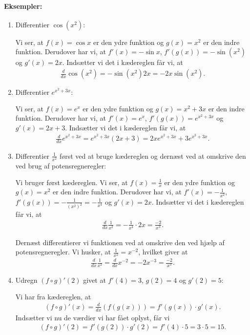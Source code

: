 \paragraph*{Eksempler:}
\begin{enumerate}
\item Differentier $\cos (x^2)$:

Vi ser, at $f(x)=\cos x$ er den ydre funktion og $g(x)=x^2$ er den indre funktion. Derudover har vi, at $f'(x)=-\sin x$, $f'(g(x))=-\sin(x^2)$ og $g'(x)=2x$. Indsætter vi det i kædereglen får vi, at
\begin{align*}
\frac{d}{dx}\cos(x^2) = -\sin (x^2) 2x = -2x\sin(x^2).
\end{align*}
\item Differentier $e^{x^2+3x}$:

Vi ser, at $f(x)=e^x$ er den ydre funktion og $g(x)=x^2+3x$ er den indre funktion. Derudover har vi, at $f'(x)=e^x$, $f'(g(x))=e^{x^2+3x}$ og $g'(x)=2x+3$. Indsætter vi det i kædereglen får vi, at
\begin{align*}
\frac{d}{dx} e^{x^2+3x}=e^{x^2+3x} (2x+3) = 2xe^{x^2+3x} + 3e^{x^2+3x}.
\end{align*}
\item Differentier $\displaystyle \frac{1}{x^2}$ først ved at bruge kædereglen og dernæst ved at omskrive den ved brug af potensregneregler:

Vi bruger først kædereglen. Vi ser, at $f(x)=\frac{1}{x}$ er den ydre funktion og $g(x)=x^2$ er den indre funktion. Derudover har vi, at $f'(x)=-\frac{1}{x^2}$, $f'(g(x))= -\frac{1}{(x^2)^2}=-\frac{1}{x^4}$ og $g'(x)=2x$. Indsætter vi det i kædereglen får vi, at
\begin{align*}
\frac{d}{dx}\frac{1}{x^2} = -\frac{1}{x^4} \cdot 2x = \frac{-2}{x^3}.
\end{align*}

Dernæst differentierer vi funktionen ved at omskrive den ved hjælp af potensregneregler. Vi husker, at $\frac{1}{x^2}=x^{-2}$, hvilket giver at
\begin{align*}
\frac{d}{dx}\frac{1}{x^2} =\frac{d}{dx} x^{-2}=-2x^{-3}=\frac{-2}{x^3}.
\end{align*}
\item Udregn $(f\circ g)'(2)$ givet at $f'(4)=3$, $g(2)=4$ og $g'(2)=5$:

Vi har fra kædereglen, at
\begin{align*}
(f \circ g)'(x)=\frac{d}{dx}(f(g(x))) = f'(g(x))\cdot g'(x).
\end{align*}
Indsætter vi nu de værdier vi har fået oplyst, får vi
\begin{align*}
(f \circ g)'(2) = f'(g(2))\cdot g'(2)=f'(4)\cdot 5 = 3 \cdot 5 = 15.
\end{align*}
\end{enumerate}

















